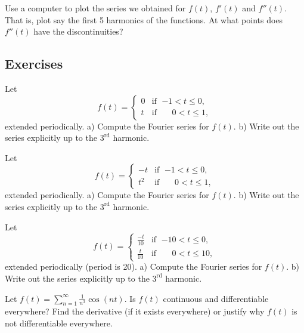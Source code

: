 \begin{exercise}
Use a computer to plot the series we obtained for $f(t)$, $f'(t)$ and
$f''(t)$.  That is, plot say the first 5 harmonics of the functions.  At what
points does $f''(t)$ have the discontinuities?
\end{exercise}

\subsection{Exercises}

\begin{exercise}
Let
\begin{equation*}
f(t) =
\begin{cases}
0 & \text{if } \; {-1} < t \leq 0 , \\
t & \text{if } \; \phantom{-}0 < t \leq  1 ,
\end{cases}
\end{equation*}
extended periodically.
a) Compute the Fourier series for $f(t)$.  b) Write out the series explicitly up
to the $3^{\text{rd}}$ harmonic.
\end{exercise}

\begin{exercise}
Let
\begin{equation*}
f(t) =
\begin{cases}
-t & \text{if } \; {-1} < t \leq 0 , \\
t^2 & \text{if } \; \phantom{-}0 < t \leq  1 ,
\end{cases}
\end{equation*}
extended periodically.
a) Compute the Fourier series for $f(t)$.  b) Write out the series explicitly up
to the $3^{\text{rd}}$ harmonic.
\end{exercise}

\begin{exercise}
Let
\begin{equation*}
f(t) =
\begin{cases}
\frac{-t}{10} & \text{if } \; {-10} < t \leq 0 , \\
\frac{t}{10} & \text{if } \; \phantom{-1}0 < t \leq  10 ,
\end{cases}
\end{equation*}
extended periodically (period is 20).
a) Compute the Fourier series for $f(t)$.  b) Write out the series explicitly up
to the $3^{\text{rd}}$ harmonic.
\end{exercise}

\begin{exercise}
Let $f(t) = \sum_{n=1}^\infty \frac{1}{n^3} \cos (n t)$.  Is $f(t)$
continuous and differentiable everywhere?  Find the derivative (if it exists
everywhere)
or justify why $f(t)$ is not differentiable everywhere.
\end{exercise}

